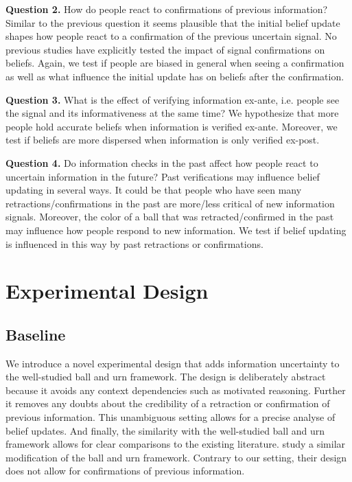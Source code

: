 \documentclass{article}
\begin{document}
\textbf{Question 2.} How do people react to confirmations of previous information? Similar to the previous question it seems plausible that the initial belief update shapes how people react to a confirmation of the previous uncertain signal. No previous studies have explicitly tested the impact of signal confirmations on beliefs. Again, we test if people are biased in general when seeing a confirmation as well as what influence the initial update has on beliefs after the confirmation.

\textbf{Question 3.} What is the effect of verifying information ex-ante, i.e. people see the signal and its informativeness at the same time? We hypothesize that more people hold accurate beliefs when information is verified ex-ante. Moreover, we test if beliefs are more dispersed when information is only verified ex-post. 

\textbf{Question 4.} Do information checks in the past affect how people react to uncertain information in the future? Past verifications may influence belief updating in several ways. It could be that people who have seen many retractions/confirmations in the past are more/less critical of new information signals. Moreover, the color of a ball that was retracted/confirmed in the past may influence how people respond to new information. We test if belief updating is influenced in this way by past retractions or confirmations.


\section{Experimental Design}

\subsection{Baseline}
We introduce a novel experimental design that adds information uncertainty to the well-studied ball and urn framework. The design is deliberately abstract because it avoids any context dependencies such as motivated reasoning. Further it removes any doubts about the credibility of a retraction or confirmation of previous information. This unambiguous setting allows for a precise analyse of belief updates. And finally, the similarity with the well-studied ball and urn framework allows for clear comparisons to the existing literature. \cite{Goncalves2022} study a similar modification of the ball and urn framework. Contrary to our setting, their design does not allow for confirmations of previous information.
\end{document}
